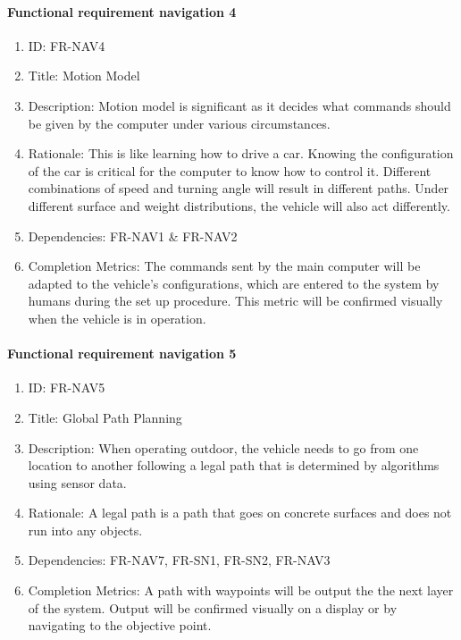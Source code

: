 \documentclass[compsoc,draftclsnofoot,onecolumn,10pt]{IEEEtran}
\begin{document}
	\paragraph{Functional requirement navigation 4}
		\begin{enumerate}
			\item ID: FR-NAV4
			\item Title: Motion Model
			\item Description: Motion model is significant as it decides what commands should be given by the computer under various circumstances.
			\item Rationale: This is like learning how to drive a car. Knowing the configuration of the car is critical for the computer to know how to control it. Different combinations of speed and turning angle will result in different paths. Under different surface and weight distributions, the vehicle will also act differently.
			\item Dependencies: FR-NAV1 \& FR-NAV2
			\item Completion Metrics: The commands sent by the main computer will be adapted to the vehicle's configurations, which are entered to the system by humans during the set up procedure. 
			This metric will be confirmed visually when the vehicle is in operation.  
		\end{enumerate} 

	\paragraph{Functional requirement navigation 5}
		\begin{enumerate}
			\item ID: FR-NAV5
			\item Title: Global Path Planning
			\item Description: When operating outdoor, the vehicle needs to go from one location to another following a legal path that is determined by algorithms using sensor data.
			\item Rationale: A legal path is a path that goes on concrete surfaces and does not run into any objects.
			\item Dependencies: FR-NAV7, FR-SN1, FR-SN2, FR-NAV3
			\item Completion Metrics: A path with waypoints will be output the the next layer of the system. 
			Output will be confirmed visually on a display or by navigating to the objective point.  
		\end{enumerate}
\end{document}
